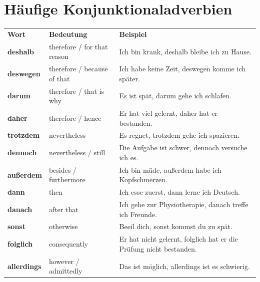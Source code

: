 \documentclass[a4paper,11pt]{article}
\begin{document}
    
    \section{Häufige Konjunktionaladverbien}
        
        \begin{tabular}{>{\bfseries}p{3cm} p{4cm} p{7cm}}
            \rowcolor{HeaderBlueDark}
            \color{white}\textbf{Wort} & \color{white}\textbf{Bedeutung} & \color{white}\textbf{Beispiel}                                     \\
            deshalb                    & therefore / for that reason     & Ich bin krank, deshalb bleibe ich zu Hause.                        \\
            deswegen                   & therefore / because of that     & Ich habe keine Zeit, deswegen komme ich später.                    \\
            darum                      & therefore / that is why         & Es ist spät, darum gehe ich schlafen.                              \\
            daher                      & therefore / hence               & Er hat viel gelernt, daher hat er bestanden.                       \\
            trotzdem                   & nevertheless                    & Es regnet, trotzdem gehe ich spazieren.                            \\
            dennoch                    & nevertheless / still            & Die Aufgabe ist schwer, dennoch versuche ich es.                   \\
            außerdem                   & besides / furthermore           & Ich bin müde, außerdem habe ich Kopfschmerzen.                     \\
            dann                       & then                            & Ich esse zuerst, dann lerne ich Deutsch.                           \\
            danach                     & after that                      & Ich gehe zur Physiotherapie, danach treffe ich Freunde.            \\
            sonst                      & otherwise                       & Beeil dich, sonst kommst du zu spät.                               \\
            folglich                   & consequently                    & Er hat nicht gelernt, folglich hat er die Prüfung nicht bestanden. \\
            allerdings                 & however / admittedly            & Das ist möglich, allerdings ist es schwierig.                      \\
        \end{tabular}
    
\end{document}
